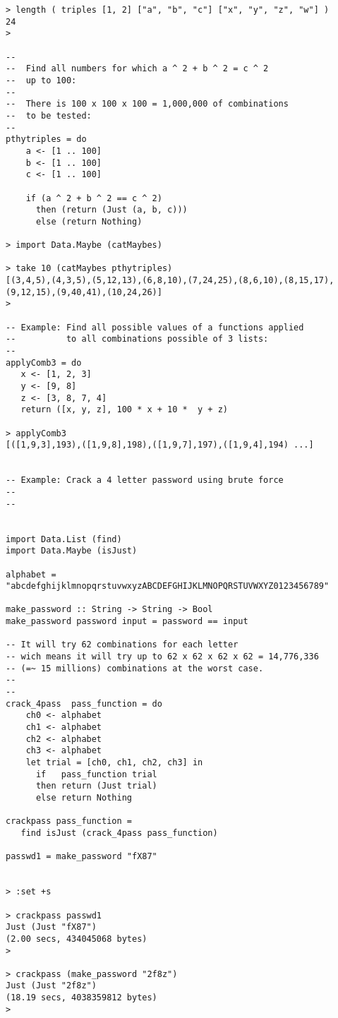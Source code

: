 \documentclass[11pt]{article}
\begin{document}
\begin{enumerate}
\begin{verbatim}
> length ( triples [1, 2] ["a", "b", "c"] ["x", "y", "z", "w"] )
24
> 

--
--  Find all numbers for which a ^ 2 + b ^ 2 = c ^ 2 
--  up to 100:
--
--  There is 100 x 100 x 100 = 1,000,000 of combinations 
--  to be tested:
--
pthytriples = do 
    a <- [1 .. 100]
    b <- [1 .. 100]
    c <- [1 .. 100]

    if (a ^ 2 + b ^ 2 == c ^ 2)
      then (return (Just (a, b, c)))
      else (return Nothing)

> import Data.Maybe (catMaybes)

> take 10 (catMaybes pthytriples)
[(3,4,5),(4,3,5),(5,12,13),(6,8,10),(7,24,25),(8,6,10),(8,15,17),(9,12,15),(9,40,41),(10,24,26)]
> 

-- Example: Find all possible values of a functions applied 
--          to all combinations possible of 3 lists:
--
applyComb3 = do 
   x <- [1, 2, 3]
   y <- [9, 8]
   z <- [3, 8, 7, 4]
   return ([x, y, z], 100 * x + 10 *  y + z)

> applyComb3 
[([1,9,3],193),([1,9,8],198),([1,9,7],197),([1,9,4],194) ...]


-- Example: Crack a 4 letter password using brute force 
--
--


import Data.List (find)
import Data.Maybe (isJust)

alphabet = "abcdefghijklmnopqrstuvwxyzABCDEFGHIJKLMNOPQRSTUVWXYZ0123456789"

make_password :: String -> String -> Bool 
make_password password input = password == input 

-- It will try 62 combinations for each letter
-- wich means it will try up to 62 x 62 x 62 x 62 = 14,776,336 
-- (=~ 15 millions) combinations at the worst case.
--
-- 
crack_4pass  pass_function = do
    ch0 <- alphabet 
    ch1 <- alphabet 
    ch2 <- alphabet 
    ch3 <- alphabet 
    let trial = [ch0, ch1, ch2, ch3] in
      if   pass_function trial
      then return (Just trial)
      else return Nothing 
    
crackpass pass_function = 
   find isJust (crack_4pass pass_function)

passwd1 = make_password "fX87" 


> :set +s

> crackpass passwd1 
Just (Just "fX87")
(2.00 secs, 434045068 bytes)
> 

> crackpass (make_password "2f8z")
Just (Just "2f8z")
(18.19 secs, 4038359812 bytes)
>
\end{verbatim}


\end{enumerate}
\end{document}

